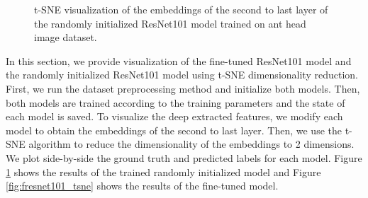 \documentclass{aci}
\numberwithin{equation}{section}
\begin{document}
\begin{figure}[h]
\begin{subfigure}{.45\textwidth}
    \end{subfigure}
    \caption{t-SNE visualization of the embeddings of the second to last layer
        of the randomly initialized ResNet101 model trained on ant head image
        dataset.}
    \label{fig:resnet101_tsne}
\end{figure}

In this section, we provide visualization of the fine-tuned ResNet101 model and
the randomly initialized ResNet101 model using t-SNE dimensionality reduction.
First, we run the dataset preprocessing method and initialize both models. Then,
both models are trained according to the training parameters and the state of
each model is saved. To visualize the deep extracted features, we modify each
model to obtain the embeddings of the second to last layer. Then, we use the
t-SNE algorithm to reduce the dimensionality of the embeddings to 2 dimensions.
We plot side-by-side the ground truth and predicted labels for each model.
Figure \ref{fig:resnet101_tsne} shows the results of the trained randomly
initialized model and Figure \ref{fig:fresnet101_tsne} shows the results of the
fine-tuned model.
\end{document}
